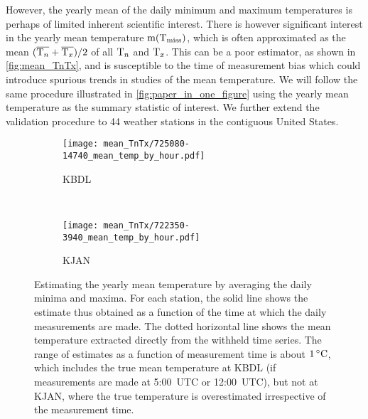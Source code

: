 However, the yearly mean of the daily minimum and maximum temperatures is perhaps of limited inherent scientific interest.
There is however significant interest in the yearly mean temperature $\operatorname{m}(\mathrm{T}_{\mathrm{miss}})$,
which is often approximated as the mean $(\overline{\mathrm{T}_{n}} + \overline{\mathrm{T}_{x}})/2$ of all $\mathrm{T}_{n}$ and $\mathrm{T}_{x}$.
This can be a poor estimator, as shown in \autoref{fig:mean_TnTx}, and is susceptible to the time of measurement bias
which could introduce spurious trends in studies of the mean temperature.
We will follow the same procedure illustrated in \autoref{fig:paper_in_one_figure}
using the yearly mean temperature as the summary statistic of interest.
We further extend the validation procedure to 44 weather stations in the contiguous United States.

\begin{figure}[t]
    \centering
    \begin{subfigure}[t]{0.37\textwidth}
    \texttt{[image: mean\_TnTx/725080-14740\_mean\_temp\_by\_hour.pdf]}
    \caption{
        \label{fig:mean_TnTx/KBDL} KBDL
    }
    \end{subfigure}
    ~
    \begin{subfigure}[t]{0.37\textwidth}
    \texttt{[image: mean\_TnTx/722350-3940\_mean\_temp\_by\_hour.pdf]}
    \caption{
        \label{fig:mean_TnTx/KJAN} KJAN
    }
    \end{subfigure}
    \caption{
        \label{fig:mean_TnTx}
        Estimating the yearly mean temperature by averaging the daily minima and maxima.
        For each station, the solid line shows the estimate thus obtained as a function of the time at which the daily
        measurements are made.
        The dotted horizontal line shows the mean temperature extracted directly from the withheld
        time series.
        The range of estimates as a function of measurement time is about $1{\,^\circ}{}\mathrm{C}$,
        which includes the true mean temperature at KBDL (if measurements are made at 5:00~UTC
        or 12:00~UTC), but not at KJAN, where the true temperature is overestimated irrespective of the
        measurement time.
    }
\end{figure}

